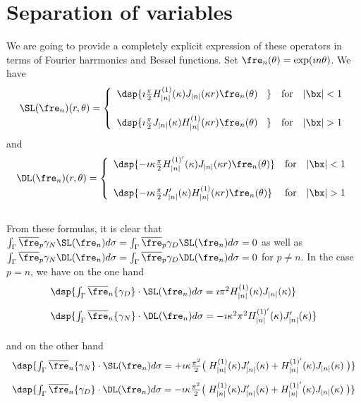 \documentclass[a4paper,11pt]{article}
\begin{document}
\section{Separation of variables}
We are going to provide a completely explicit expression of these operators in terms 
of Fourier harrmonics and Bessel functions. Set $\fre_{n}(\theta) = \exp(\imath n\theta)$. 
We have 
$$
\SL(\fre_{n})(r,\theta) = 
\left\{\begin{array}{ll}
\dsp{\imath\frac{\pi}{2}H^{(1)}_{\vert n\vert}(\kappa)J_{\vert n\vert}(\kappa r)\fre_{n}(\theta)\phantom{\imath\kappa} } & \textrm{for}\quad \vert \bx\vert<1\\[15pt]
\dsp{\imath\frac{\pi}{2}J_{\vert n\vert}(\kappa)H^{(1)}_{\vert n\vert}(\kappa r)\fre_{n}(\theta)\phantom{\imath\kappa} } & \textrm{for}\quad \vert \bx\vert>1
\end{array}\right.
$$
and 
$$
\DL(\fre_{n})(r,\theta) = 
\left\{\begin{array}{ll}
\dsp{ -\imath\kappa\frac{\pi}{2}H^{(1)'}_{\vert n\vert}(\kappa)J_{\vert n\vert}(\kappa r)\fre_{n}(\theta) } & \textrm{for}\quad \vert \bx\vert<1\\[15pt]
\dsp{ -\imath\kappa\frac{\pi}{2}J_{\vert n\vert}'(\kappa)H^{(1)}_{\vert n\vert}(\kappa r)\fre_{n}(\theta) } & \textrm{for}\quad \vert \bx\vert>1
\end{array}\right.
$$
\quad\\[5pt]
From these formulas, it is  clear that $\int_{\Gamma}\overline{\fre}_{p}\gamma_{N}\SL(\fre_{n}) d\sigma = \int_{\Gamma}\overline{\fre}_{p}\gamma_{D}\SL(\fre_{n}) d\sigma = 0$ 
as well as $\int_{\Gamma}\overline{\fre}_{p}\gamma_{N}\DL(\fre_{n}) d\sigma = \int_{\Gamma}\overline{\fre}_{p}\gamma_{D}\DL(\fre_{n}) d\sigma = 0$ for $p\neq n$. In the 
case $p=n$, we have on the one hand 
$$
\begin{array}{l}
\dsp{ \int_{\Gamma}\overline{\fre}_{n}\{\gamma_{D}\}\cdot\SL(\fre_{n}) d\sigma = \imath \pi^{2} H^{(1)}_{\vert n\vert}(\kappa) J_{\vert n\vert}(\kappa) }\\[10pt]
\dsp{ \int_{\Gamma}\overline{\fre}_{n}\{\gamma_{N}\}\cdot\DL(\fre_{n}) d\sigma = -\imath \kappa^{2} \pi^{2} H^{(1)'}_{\vert n\vert}(\kappa) J_{\vert n\vert}'(\kappa) }\\[10pt]
\end{array}
$$
and on the other hand 
$$
\begin{array}{l}
\dsp{ \int_{\Gamma}\overline{\fre}_{n}\{\gamma_{N}\}\cdot\SL(\fre_{n}) d\sigma = +\imath\kappa\frac{\pi^{2}}{2}
\big(\; H^{(1)}_{\vert n\vert}(\kappa)J_{\vert n\vert}'(\kappa)+H^{(1)'}_{\vert n\vert}(\kappa)J_{\vert n\vert}(\kappa)\; \big) }\\[10pt]
\dsp{ \int_{\Gamma}\overline{\fre}_{n}\{\gamma_{D}\}\cdot\DL(\fre_{n}) d\sigma = -\imath\kappa\frac{\pi^{2}}{2} 
\big(\; H^{(1)}_{\vert n\vert}(\kappa)J_{\vert n\vert}'(\kappa)+H^{(1)'}_{\vert n\vert}(\kappa)J_{\vert n\vert}(\kappa)\; \big) }\\[10pt]
\end{array}
$$
\end{document}
